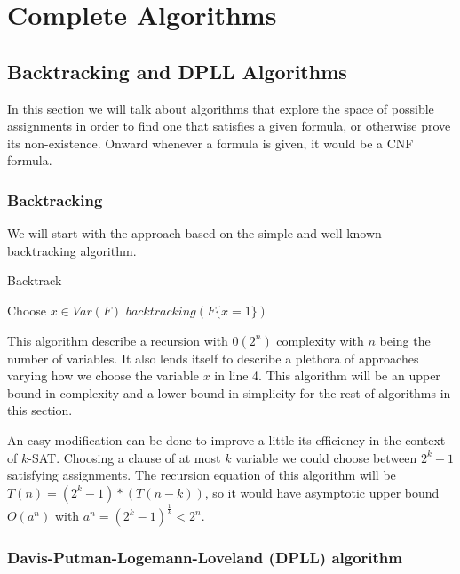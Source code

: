 
\chapter{Complete Algorithms}
\section{Backtracking and DPLL Algorithms}
\label{sec:dpll}
In this section we will talk about algorithms that explore the space of possible assignments in order to find one that satisfies a given formula, or otherwise prove its non-existence. Onward whenever a formula is given, it would be a CNF formula.

\subsection{Backtracking}
We  will start with the approach based on the simple and well-known backtracking algorithm.

\begin{algorithm}
  \caption{Backtrack}\label{bt}
  \begin{algorithmic}[1]
     
    \EndIf
     
    \EndIf
    \State Choose $x \in Var(F)$
     
    \EndIf
    \State \Return $backtracking(F\{x=1\})$
  \end{algorithmic}
\end{algorithm}


This algorithm describe a recursion with $0(2^n)$ complexity with $n$ being the number of variables. It also lends itself to describe a plethora of approaches varying how we choose the variable $x$ in line 4. This algorithm will be an upper bound in complexity and a lower bound in simplicity for the rest of algorithms in this section.


An easy modification can be done to improve a little its efficiency in the context of $k$-SAT. Choosing a clause of at most $k$ variable we could choose between $2^k-1$ satisfying assignments. The recursion equation of this algorithm will be $T(n) = (2^k-1)*(T(n-k))$, so it would have asymptotic upper bound $O(a^n)$ with $a^n = (2^k-1)^{\frac{1}{k}}<2^n$.


\subsection{Davis-Putman-Logemann-Loveland (DPLL) algorithm}

